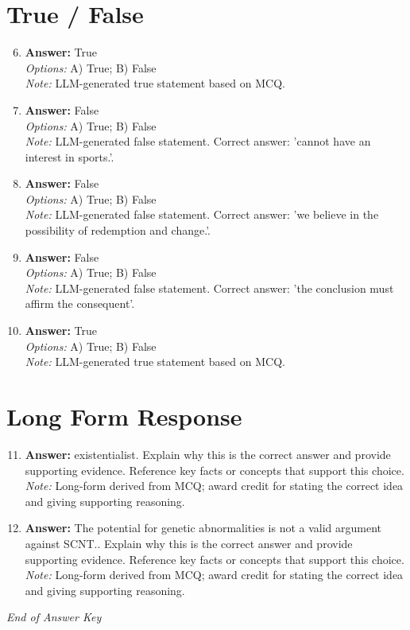\documentclass[12pt]{article}
\begin{document}
\section*{True / False}
\begin{enumerate}[label=\arabic*.]
\setcounter{enumi}{5}
\item \textbf{Answer:} True
\\ \textit{Options:} A) True; B) False
\\ \textit{Note:} LLM-generated true statement based on MCQ.
\item \textbf{Answer:} False
\\ \textit{Options:} A) True; B) False
\\ \textit{Note:} LLM-generated false statement. Correct answer: 'cannot have an interest in sports.'.
\item \textbf{Answer:} False
\\ \textit{Options:} A) True; B) False
\\ \textit{Note:} LLM-generated false statement. Correct answer: 'we believe in the possibility of redemption and change.'.
\item \textbf{Answer:} False
\\ \textit{Options:} A) True; B) False
\\ \textit{Note:} LLM-generated false statement. Correct answer: 'the conclusion must affirm the consequent'.
\item \textbf{Answer:} True
\\ \textit{Options:} A) True; B) False
\\ \textit{Note:} LLM-generated true statement based on MCQ.
\end{enumerate}

\section*{Long Form Response}
\begin{enumerate}[label=\arabic*.]
\setcounter{enumi}{10}
\item \textbf{Answer:} existentialist. Explain why this is the correct answer and provide supporting evidence. Reference key facts or concepts that support this choice.
\\ \textit{Note:} Long-form derived from MCQ; award credit for stating the correct idea and giving supporting reasoning.
\item \textbf{Answer:} The potential for genetic abnormalities is not a valid argument against SCNT.. Explain why this is the correct answer and provide supporting evidence. Reference key facts or concepts that support this choice.
\\ \textit{Note:} Long-form derived from MCQ; award credit for stating the correct idea and giving supporting reasoning.
\end{enumerate}

\vfill
\noindent\textit{End of Answer Key}
\end{document}
